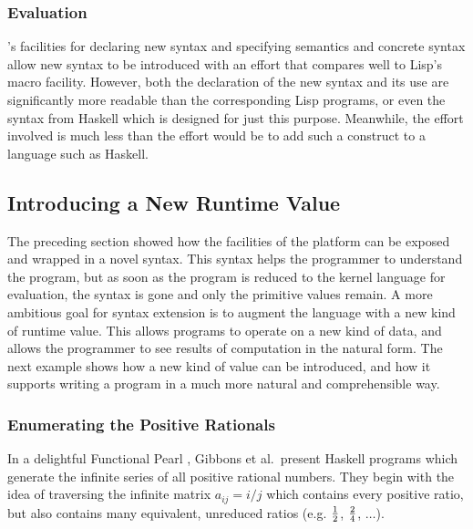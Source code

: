 
\subsubsection{Evaluation}
\Meta's facilities for declaring new syntax and specifying semantics and concrete syntax allow new syntax to be introduced with an effort that compares well to Lisp's macro facility. However, both the declaration of the new syntax and its use are significantly more readable than the corresponding Lisp programs, or even the syntax from Haskell which is designed for just this purpose. Meanwhile, the effort involved is much less than the effort would be to add such a construct to a language such as Haskell.


%
%
\subsection{Introducing a New Runtime Value}
The preceding section showed how the facilities of the platform can be exposed and wrapped in a novel syntax. This syntax helps the programmer to understand the program, but as soon as the program is reduced to the kernel language for evaluation, the syntax is gone and only the primitive values remain. A more ambitious goal for syntax extension is to augment the language with a new kind of runtime value. This allows programs to operate on a new kind of data, and allows the programmer to see results of computation in the natural form. The next example shows how a new kind of value can be introduced, and how it supports writing a program in a much more natural and comprehensible way.

\subsubsection{Enumerating the Positive Rationals}
In a delightful Functional Pearl \cite{gibbons}, Gibbons et al.\ present Haskell programs which generate the infinite series of all positive rational numbers. They begin with the idea of traversing the infinite matrix $a_{ij} = i/j$ which contains every positive ratio, but also contains many equivalent, unreduced ratios (e.g. $\nicefrac{1}{2}$, $\nicefrac{2}{4}$, $\dots$).


